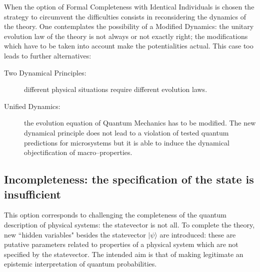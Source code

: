 \documentclass[10pt,a4paper]{article}
\begin{document}
When the option of Formal Completeness with Identical Individuals
is chosen the strategy to circumvent the difficulties consists in
reconsidering the dynamics of the theory. One contemplates the
possibility of a Modified Dynamics: the unitary evolution law of
the theory is not always or not exactly right; the modifications
which have to be taken into account make the potentialities
actual. This case too leads to further alternatives:
\begin{description}
\item[Two Dynamical Principles:] different physical situations
require different evolution laws.
\item[Unified Dynamics:] the evolution equation of Quantum
Mechanics has to be modified. The new dynamical principle does not
lead to a violation of tested quantum predictions for microsystems
but it is able to induce the dynamical objectification of
macro--properties.
\end{description}


\subsection{Incompleteness: the specification of the state is
insufficient} \label{sec32}

This option corresponds to challenging the completeness of the
quantum description of physical systems: the statevector is not
all. To complete the theory, new ``hidden variables" besides the
statevector $|\psi\rangle$ are introduced: these are putative
parameters related to properties of a physical system which are
not specified by the statevector. The intended aim is that of
making legitimate an epistemic interpretation of quantum
probabilities.
\end{document}
